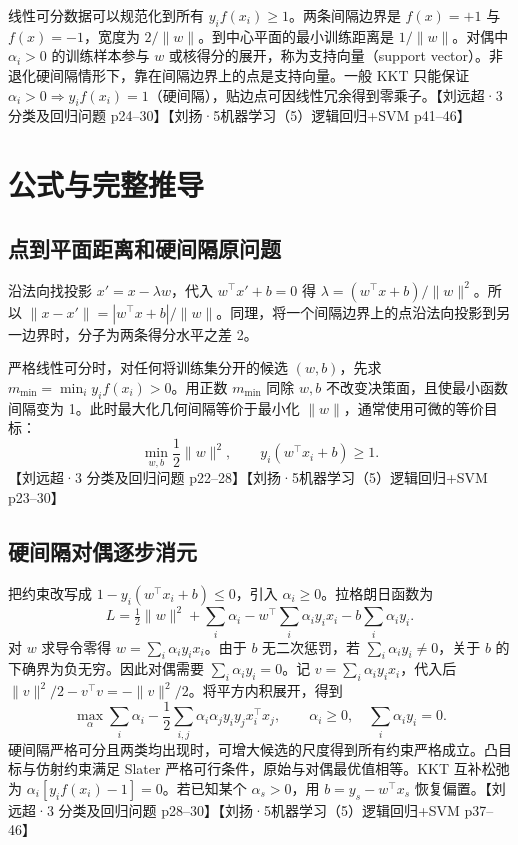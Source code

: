 \documentclass[UTF8,a4paper,zihao=-4,fontset=fandol]{ctexrep}
\begin{document}
线性可分数据可以规范化到所有 $y_i f(x_i)\ge1$。两条间隔边界是 $f(x)=+1$ 与 $f(x)=-1$，宽度为 $2/\|w\|$。到中心平面的最小训练距离是 $1/\|w\|$。对偶中 $\alpha_i>0$ 的训练样本参与 $w$ 或核得分的展开，称为支持向量（support vector）。非退化硬间隔情形下，靠在间隔边界上的点是支持向量。一般 KKT 只能保证 $\alpha_i>0\Longrightarrow y_i f(x_i)=1$（硬间隔），贴边点可因线性冗余得到零乘子。【刘远超·3 分类及回归问题 p24–30】【刘扬·5机器学习（5）逻辑回归+SVM p41–46】

\section{公式与完整推导}
\subsection*{点到平面距离和硬间隔原问题}
沿法向找投影 $x'=x-\lambda w$，代入 $w^\top x'+b=0$ 得 $\lambda=(w^\top x+b)/\|w\|^2$。所以 $\|x-x'\|=|w^\top x+b|/\|w\|$。同理，将一个间隔边界上的点沿法向投影到另一边界时，分子为两条得分水平之差 2。

严格线性可分时，对任何将训练集分开的候选 $(w,b)$，先求 $m_{\min}=\min_i y_i f(x_i)>0$。用正数 $m_{\min}$ 同除 $w,b$ 不改变决策面，且使最小函数间隔变为 1。此时最大化几何间隔等价于最小化 $\|w\|$，通常使用可微的等价目标：
\[
 \min_{w,b}\frac12\|w\|^2,\qquad
 y_i(w^\top x_i+b)\ge1.
\]
【刘远超·3 分类及回归问题 p22–28】【刘扬·5机器学习（5）逻辑回归+SVM p23–30】

\subsection*{硬间隔对偶逐步消元}
把约束改写成 $1-y_i(w^\top x_i+b)\le0$，引入 $\alpha_i\ge0$。拉格朗日函数为
\[
 L=\tfrac12\|w\|^2+\sum_i\alpha_i
  -w^\top\sum_i\alpha_i y_i x_i-b\sum_i\alpha_i y_i.
\]
对 $w$ 求导令零得 $w=\sum_i\alpha_i y_ix_i$。由于 $b$ 无二次惩罚，若 $\sum_i\alpha_i y_i\ne0$，关于 $b$ 的下确界为负无穷。因此对偶需要 $\sum_i\alpha_i y_i=0$。记 $v=\sum_i\alpha_i y_ix_i$，代入后 $\|v\|^2/2-v^\top v=-\|v\|^2/2$。将平方内积展开，得到
\[
 \max_\alpha \sum_i\alpha_i
 -\frac12\sum_{i,j}\alpha_i\alpha_j y_i y_j x_i^\top x_j,
 \qquad
 \alpha_i\ge0,\quad\sum_i\alpha_i y_i=0.
\]
硬间隔严格可分且两类均出现时，可增大候选的尺度得到所有约束严格成立。凸目标与仿射约束满足 Slater 严格可行条件，原始与对偶最优值相等。KKT 互补松弛为 $\alpha_i[y_i f(x_i)-1]=0$。若已知某个 $\alpha_s>0$，用 $b=y_s-w^\top x_s$ 恢复偏置。【刘远超·3 分类及回归问题 p28–30】【刘扬·5机器学习（5）逻辑回归+SVM p37–46】
\end{document}
